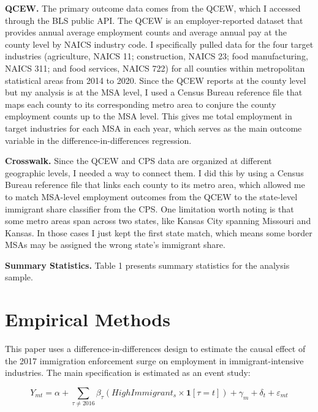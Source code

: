 \documentclass[12pt]{article}
\begin{document}
\textbf{QCEW.} The primary outcome data comes from the QCEW, which I accessed through the BLS public API. The QCEW is an employer-reported dataset that provides annual average employment counts and average annual pay at the county level by NAICS industry code. I specifically pulled data for the four target industries (agriculture, NAICS 11; construction, NAICS 23; food manufacturing, NAICS 311; and food services, NAICS 722) for all counties within metropolitan statistical areas from 2014 to 2020. Since the QCEW reports at the county level but my analysis is at the MSA level, I used a Census Bureau reference file that maps each county to its corresponding metro area to conjure the county employment counts up to the MSA level. This gives me total employment in target industries for each MSA in each year, which serves as the main outcome variable in the difference-in-differences regression.
 
\textbf{Crosswalk.} Since the QCEW and CPS data are organized at different geographic levels, I needed a way to connect them. I did this by using a Census Bureau reference file that links each county to its metro area, which allowed me to match MSA-level employment outcomes from the QCEW to the state-level immigrant share classifier from the CPS. One limitation worth noting is that some metro areas span across two states, like Kansas City spanning Missouri and Kansas. In those cases I just kept the first state match, which means some border MSAs may be assigned the wrong state's immigrant share.
 
\textbf{Summary Statistics.} Table 1 presents summary statistics for
the analysis sample.

\section{Empirical Methods}

This paper uses a difference-in-differences design to estimate the causal effect of the 2017 immigration enforcement surge on employment in immigrant-intensive industries. The main specification is estimated as an event study:

\begin{equation}
Y_{mt} = \alpha + \sum_{\tau \neq 2016} \beta_\tau (HighImmigrant_s \times \mathbf{1}[\tau = t]) + \gamma_m + \delta_t + \varepsilon_{mt}
\end{equation}
\end{document}
